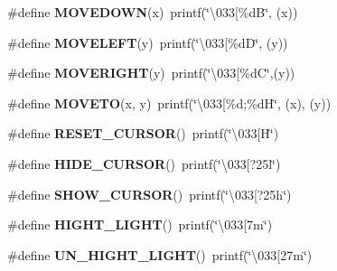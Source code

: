 \begin{DoxyCompactItemize}
\item 
\#define \textbf{ M\+O\+V\+E\+D\+O\+WN}(x)~printf(\char`\"{}\textbackslash{}033[\%dB\char`\"{}, (x))
\item 
\#define \textbf{ M\+O\+V\+E\+L\+E\+FT}(y)~printf(\char`\"{}\textbackslash{}033[\%dD\char`\"{}, (y))
\item 
\#define \textbf{ M\+O\+V\+E\+R\+I\+G\+HT}(y)~printf(\char`\"{}\textbackslash{}033[\%dC\char`\"{},(y))
\item 
\#define \textbf{ M\+O\+V\+E\+TO}(x,  y)~printf(\char`\"{}\textbackslash{}033[\%d;\%dH\char`\"{}, (x), (y))
\item 
\#define \textbf{ R\+E\+S\+E\+T\+\_\+\+C\+U\+R\+S\+OR}()~printf(\char`\"{}\textbackslash{}033[H\char`\"{})
\item 
\#define \textbf{ H\+I\+D\+E\+\_\+\+C\+U\+R\+S\+OR}()~printf(\char`\"{}\textbackslash{}033[?25l\char`\"{})
\item 
\#define \textbf{ S\+H\+O\+W\+\_\+\+C\+U\+R\+S\+OR}()~printf(\char`\"{}\textbackslash{}033[?25h\char`\"{})
\item 
\#define \textbf{ H\+I\+G\+H\+T\+\_\+\+L\+I\+G\+HT}()~printf(\char`\"{}\textbackslash{}033[7m\char`\"{})
\item 
\#define \textbf{ U\+N\+\_\+\+H\+I\+G\+H\+T\+\_\+\+L\+I\+G\+HT}()~printf(\char`\"{}\textbackslash{}033[27m\char`\"{})
\end{DoxyCompactItemize}
